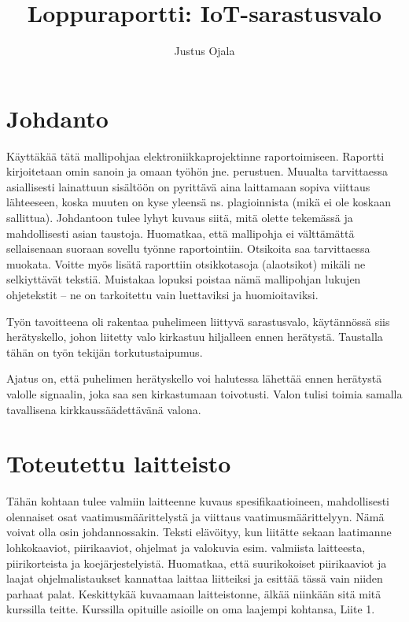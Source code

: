 \documentclass{article}
\author{Justus Ojala}
\title{Loppuraportti: IoT-sarastusvalo}
\begin{document}
\maketitle

\newpage
\section*{Johdanto}

Käyttäkää tätä mallipohjaa elektroniikkaprojektinne raportoimiseen. Raportti kirjoitetaan omin sanoin ja omaan työhön jne. perustuen. Muualta tarvittaessa asiallisesti lainattuun sisältöön on pyrittävä aina laittamaan sopiva viittaus lähteeseen, koska muuten on kyse yleensä ns. plagioinnista (mikä ei ole koskaan sallittua).
Johdantoon tulee lyhyt kuvaus siitä, mitä olette tekemässä ja mahdollisesti asian taustoja.
Huomatkaa, että mallipohja ei välttämättä sellaisenaan suoraan sovellu työnne raportointiin. Otsikoita saa tarvittaessa muokata. Voitte myös lisätä raporttiin otsikkotasoja (alaotsikot) mikäli ne selkiyttävät tekstiä. Muistakaa lopuksi poistaa nämä mallipohjan lukujen ohjetekstit – ne on tarkoitettu vain luettaviksi ja huomioitaviksi.

Työn tavoitteena oli rakentaa puhelimeen liittyvä sarastusvalo, käytännössä siis herätyskello, johon liitetty valo kirkastuu hiljalleen ennen herätystä. Taustalla tähän on työn tekijän torkutustaipumus.

Ajatus on, että puhelimen herätyskello voi halutessa lähettää ennen herätystä valolle signaalin, joka saa sen kirkastumaan toivotusti. Valon tulisi toimia samalla tavallisena kirkkaussäädettävänä valona.

\newpage
\section*{Toteutettu laitteisto}

Tähän kohtaan tulee valmiin laitteenne kuvaus spesifikaatioineen, mahdollisesti olennaiset osat vaatimusmäärittelystä ja viittaus vaatimusmäärittelyyn. Nämä voivat olla osin johdannossakin.
Teksti elävöityy, kun liitätte sekaan laatimanne lohkokaaviot, piirikaaviot, ohjelmat ja valokuvia esim. valmiista laitteesta, piirikorteista ja koejärjestelyistä. Huomatkaa, että suurikokoiset piirikaaviot ja laajat ohjelmalistaukset kannattaa laittaa liitteiksi ja esittää tässä vain niiden parhaat palat.
Keskittykää kuvaamaan laitteistonne, älkää niinkään sitä mitä kurssilla teitte. Kurssilla opituille asioille on oma laajempi kohtansa, Liite 1.
\end{document}
